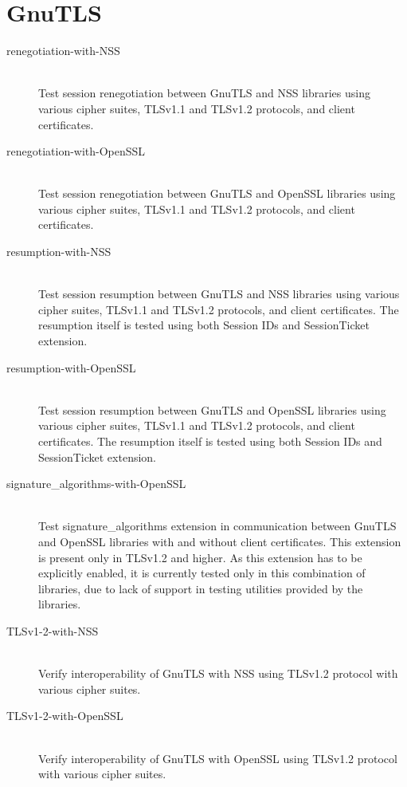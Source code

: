 \section{GnuTLS}
    \begin{description}
        \item[renegotiation-with-NSS] \hfill \\
            Test session renegotiation between GnuTLS and NSS libraries using
            various cipher suites, TLSv1.1 and TLSv1.2 protocols, and
            client certificates.
        \item[renegotiation-with-OpenSSL] \hfill \\
            Test session renegotiation between GnuTLS and OpenSSL libraries using
            various cipher suites, TLSv1.1 and TLSv1.2 protocols, and
            client certificates.
        \item[resumption-with-NSS] \hfill \\
            Test session resumption between GnuTLS and NSS libraries using
            various cipher suites, TLSv1.1 and TLSv1.2 protocols, and
            client certificates. The resumption itself is tested using both
            Session IDs and SessionTicket extension.
        \item[resumption-with-OpenSSL] \hfill \\
            Test session resumption between GnuTLS and OpenSSL libraries using
            various cipher suites, TLSv1.1 and TLSv1.2 protocols, and
            client certificates. The resumption itself is tested using both
            Session IDs and SessionTicket extension.
        \item[signature\_algorithms-with-OpenSSL] \hfill \\
            Test signature\_algorithms extension in communication between
            GnuTLS and OpenSSL libraries with and without client certificates.
            This extension is present only in TLSv1.2 and higher.
            As this extension
            has to be explicitly enabled, it is currently tested only in
            this combination of libraries, due to lack of support in testing
            utilities provided by the libraries.
        \item[TLSv1-2-with-NSS] \hfill \\
            Verify interoperability of GnuTLS with NSS using TLSv1.2 protocol
            with various cipher suites.
        \item[TLSv1-2-with-OpenSSL] \hfill \\
            Verify interoperability of GnuTLS with OpenSSL using TLSv1.2 protocol
            with various cipher suites.
    \end{description}
